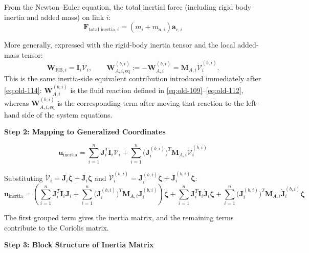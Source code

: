 \documentclass[12pt,a4paper]{report}
\begin{document}
From the Newton--Euler equation, the total inertial force (including rigid body inertia and added mass) on link $i$:
\begin{equation}
\mathbf{F}_{\text{total inertia},i} = (m_i + m_{a,i}) \mathbf{a}_{c,i}
\end{equation}

More generally, expressed with the rigid-body inertia tensor and the local added-mass tensor:
\begin{equation}
\mathbf{W}_{\text{RB},i} = \mathbf{I}_i \dot{\mathcal{V}}_i,
\qquad
\mathbf{W}_{A,i,\mathrm{eq}}^{(b,i)}
:=
-\mathbf{W}_{A,i}^{(b,i)}
=
\mathbf{M}_{A,i} \dot{\mathcal{V}}_i^{(b,i)}.
\end{equation}
This is the same inertia-side equivalent contribution introduced immediately after \eqref{eq:old-114}: $\mathbf{W}_{A,i}^{(b,i)}$ is the fluid reaction defined in \eqref{eq:old-109}--\eqref{eq:old-112}, whereas $\mathbf{W}_{A,i,\mathrm{eq}}^{(b,i)}$ is the corresponding term after moving that reaction to the left-hand side of the system equations.

\textbf{Step 2: Mapping to Generalized Coordinates}

\begin{equation}
\mathbf{u}_{\text{inertia}}
=
\sum_{i=1}^{n} \mathbf{J}_i^T \mathbf{I}_i \dot{\mathcal{V}}_i
+
\sum_{i=1}^{n} \bigl(\mathbf{J}_i^{(b,i)}\bigr)^T \mathbf{M}_{A,i} \dot{\mathcal{V}}_i^{(b,i)}
\label{eq:old-117}
\end{equation}

Substituting $\dot{\mathcal{V}}_i = \mathbf{J}_i \dot{\boldsymbol{\zeta}} + \dot{\mathbf{J}}_i \boldsymbol{\zeta}$ and $\dot{\mathcal{V}}_i^{(b,i)} = \mathbf{J}_i^{(b,i)} \dot{\boldsymbol{\zeta}} + \dot{\mathbf{J}}_i^{(b,i)} \boldsymbol{\zeta}$:
\begin{equation}
\mathbf{u}_{\text{inertia}}
=
\left(
\sum_{i=1}^{n} \mathbf{J}_i^T \mathbf{I}_i \mathbf{J}_i
+
\sum_{i=1}^{n} \bigl(\mathbf{J}_i^{(b,i)}\bigr)^T \mathbf{M}_{A,i} \mathbf{J}_i^{(b,i)}
\right)\dot{\boldsymbol{\zeta}}
+
\sum_{i=1}^{n} \mathbf{J}_i^T \mathbf{I}_i \dot{\mathbf{J}}_i \boldsymbol{\zeta}
+
\sum_{i=1}^{n} \bigl(\mathbf{J}_i^{(b,i)}\bigr)^T \mathbf{M}_{A,i} \dot{\mathbf{J}}_i^{(b,i)} \boldsymbol{\zeta}
\end{equation}

The first grouped term gives the inertia matrix, and the remaining terms contribute to the Coriolis matrix.

\textbf{Step 3: Block Structure of Inertia Matrix}
\end{document}
